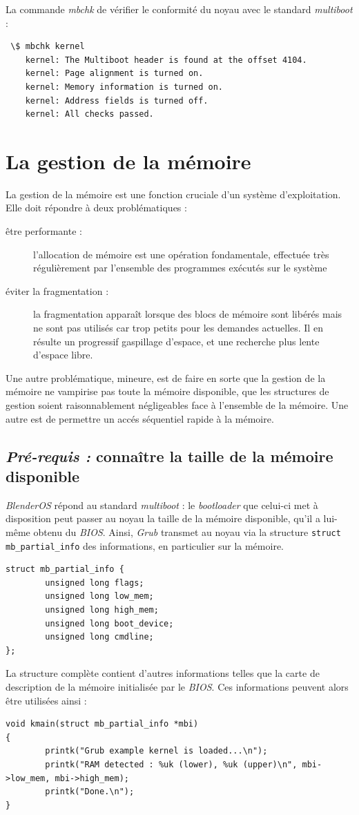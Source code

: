 \documentclass{article}
\begin{document}
 La commande \emph{mbchk} de vérifier le conformité du noyau avec le standard \emph{multiboot} :
 \begin{verbatim}
 \$ mbchk kernel
	kernel: The Multiboot header is found at the offset 4104.
	kernel: Page alignment is turned on.
	kernel: Memory information is turned on.
	kernel: Address fields is turned off.
	kernel: All checks passed.

 \end{verbatim}

\section{La gestion de la mémoire}

  La gestion de la mémoire est une fonction cruciale d'un système d'exploitation. Elle doit répondre à deux problématiques :
  \begin{description}
  \item[être performante :] l'allocation de mémoire est une opération fondamentale, effectuée très régulièrement par l'ensemble des programmes exécutés sur le système
  \item[éviter la fragmentation :] la fragmentation apparaît lorsque des blocs de mémoire sont libérés mais ne sont pas utilisés car trop petits pour les demandes actuelles. Il en résulte un progressif gaspillage d'espace, et une recherche plus lente d'espace libre.
  \end{description}
  Une autre problématique, mineure, est de faire en sorte que la gestion de la mémoire ne vampirise pas toute la mémoire disponible, que les structures de gestion soient raisonnablement négligeables face à l'ensemble de la mémoire. Une autre est de permettre un accés séquentiel rapide à la mémoire.

\subsection{\textsl{Pré-requis :} connaître la taille de la mémoire disponible}
  \emph{BlenderOS} répond au standard \emph{multiboot} : le \emph{bootloader} que celui-ci met à disposition peut passer au noyau la taille de la mémoire disponible, qu'il a lui-même obtenu du \emph{BIOS}. Ainsi, \emph{Grub} transmet au noyau via la structure 
\verb|struct mb_partial_info| des informations, en particulier sur la mémoire.
\begin{lstlisting}
struct mb_partial_info {
        unsigned long flags;
        unsigned long low_mem;
        unsigned long high_mem;
        unsigned long boot_device;
        unsigned long cmdline;
};
\end{lstlisting}
  La structure complète contient d'autres informations telles que la carte de description de la mémoire initialisée par le \emph{BIOS}.
  Ces informations peuvent alors être utilisées ainsi : 
\begin{lstlisting}
void kmain(struct mb_partial_info *mbi)
{
        printk("Grub example kernel is loaded...\n");
        printk("RAM detected : %uk (lower), %uk (upper)\n", mbi->low_mem, mbi->high_mem);
        printk("Done.\n");
}
\end{lstlisting}
\end{document}
